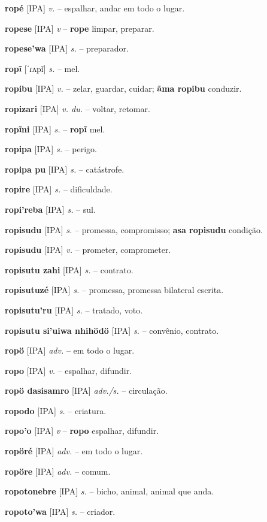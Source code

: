 \textbf{ropé} [IPA] \textit{v.} -- espalhar, andar em todo o lugar.

\textbf{ropese} [IPA] \textit{v} -- \textbf{rope} limpar, preparar.

\textbf{ropese'wa} [IPA] \textit{s.} -- preparador.

\textbf{ropĩ} [ˈɾʌpĩ] \textit{s.} -- mel.

\textbf{ropibu} [IPA] \textit{v.} -- zelar, guardar, cuidar; \textbf{ãma ropibu} conduzir.

\textbf{ropizari} [IPA] \textit{v. du.} -- voltar, retomar.

\textbf{ropĩni} [IPA] \textit{s.} -- \textbf{ropĩ} mel.

\textbf{ropipa} [IPA] \textit{s.} -- perigo.

\textbf{ropipa pu} [IPA] \textit{s.} -- catástrofe.

\textbf{ropire} [IPA] \textit{s.} -- dificuldade.

\textbf{ropi'reba} [IPA] \textit{s.} -- sul.

\textbf{ropisudu} [IPA] \textit{s.} -- promessa, compromisso; \textbf{asa ropisudu} condição.

\textbf{ropisudu} [IPA] \textit{v.} -- prometer, comprometer.

\textbf{ropisutu zahi} [IPA] \textit{s.} -- contrato.

\textbf{ropisutuzé} [IPA] \textit{s.} -- promessa, promessa bilateral escrita.

\textbf{ropisutu'ru} [IPA] \textit{s.} -- tratado, voto.

\textbf{ropisutu si'uiwa nhihödö} [IPA] \textit{s.} -- convênio, contrato.

\textbf{ropö} [IPA] \textit{adv.} -- em todo o lugar.

\textbf{ropo} [IPA] \textit{v.} -- espalhar, difundir.

\textbf{ropö dasisamro} [IPA] \textit{adv./s.} -- circulação.

\textbf{ropodo} [IPA] \textit{s.} -- criatura.

\textbf{ropo'o} [IPA] \textit{v} -- \textbf{ropo} espalhar, difundir.

\textbf{ropöré} [IPA] \textit{adv.} -- em todo o lugar.

\textbf{ropöre} [IPA] \textit{adv.} -- comum.

\textbf{ropotonebre} [IPA] \textit{s.} -- bicho, animal, animal que anda.

\textbf{ropoto'wa} [IPA] \textit{s.} -- criador.

